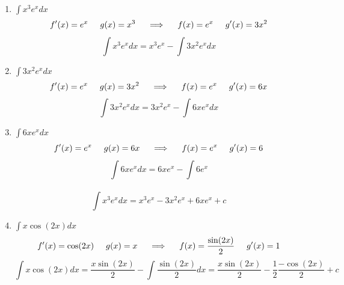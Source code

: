 \begin{exercise}\phantom{}
    \begin{enumerate}
        \item $\int x^3e^xdx$
        \begin{equation*}f'(x)=e^x\hspace{.5cm}g(x)=x^3\hspace{.5cm}\Longrightarrow\hspace{.5cm}f(x)=e^x\hspace{.5cm}g'(x)=3x^2\end{equation*}
        \begin{equation*}\int x^3e^xdx = x^3e^x-\int 3x^2e^xdx\end{equation*}
        \item[] $\int 3x^2e^xdx$
        \begin{equation*}f'(x)=e^x\hspace{.5cm}g(x)=3x^2\hspace{.5cm}\Longrightarrow\hspace{.5cm}f(x)=e^x\hspace{.5cm}g'(x)=6x\end{equation*}
        \begin{equation*}\int 3x^2e^xdx = 3x^2e^x-\int 6xe^xdx\end{equation*}
        \item[] $\int 6xe^xdx$
        \begin{equation*}f'(x)=e^x\hspace{.5cm}g(x)=6x\hspace{.5cm}\Longrightarrow\hspace{.5cm}f(x)=e^x\hspace{.5cm}g'(x)=6\end{equation*}
        \begin{equation*}\int 6xe^xdx = 6xe^x-\int 6e^x\end{equation*}
        \\
        \begin{equation*}
            \int x^3e^xdx = x^3e^x-3x^2e^x+6xe^x+c
        \end{equation*}
        
        \item $\int x\cos(2x)dx$
        \begin{equation*}f'(x)=\cos(2x)\hspace{.5cm}g(x)=x\hspace{.5cm}\Longrightarrow\hspace{.5cm}f(x)=\frac{\sin(2x)}{2}\hspace{.5cm}g'(x)=1\end{equation*}
        \begin{equation*}\int x\cos(2x)dx = \frac{x\sin(2x)}{2}-\int\frac{\sin(2x)}{2}dx=\frac{x\sin(2x)}{2}-\frac{1}{2}\frac{-\cos(2x)}{2}+c\end{equation*}
        

\end{enumerate}
\end{exercise}
